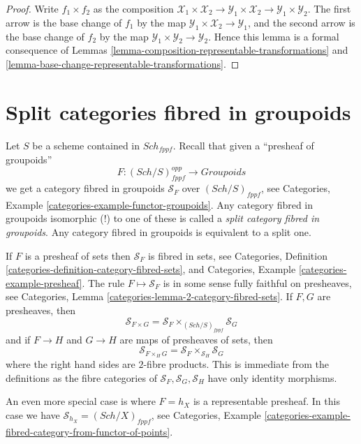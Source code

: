 \documentclass{stacks-project}
\theoremstyle{plain}
\theoremstyle{definition}
\theoremstyle{remark}
\numberwithin{equation}{subsection}
\def\Sch{\mathit{Sch}}
\begin{document}
\begin{proof}
Write $f_1 \times f_2$ as the composition
$\mathcal{X}_1 \times \mathcal{X}_2 \to
\mathcal{Y}_1 \times \mathcal{X}_2 \to
\mathcal{Y}_1 \times \mathcal{Y}_2$.
The first arrow is the base change of $f_1$ by the map
$\mathcal{Y}_1 \times \mathcal{X}_2 \to \mathcal{Y}_1$, and the second arrow
is the base change of $f_2$ by the map
$\mathcal{Y}_1 \times \mathcal{Y}_2 \to \mathcal{Y}_2$.
Hence this lemma is a formal
consequence of Lemmas \ref{lemma-composition-representable-transformations}
and \ref{lemma-base-change-representable-transformations}.
\end{proof}



\section{Split categories fibred in groupoids}
\label{section-split}

\noindent
Let $S$ be a scheme contained in $\Sch_{fppf}$.
Recall that given a ``presheaf of groupoids''
$$
F : (\Sch/S)_{fppf}^{opp} \longrightarrow \textit{Groupoids}
$$
we get a category fibred in groupoids $\mathcal{S}_F$ over
$(\Sch/S)_{fppf}$, see
Categories, Example \ref{categories-example-functor-groupoids}.
Any category fibred in groupoids isomorphic (!) to one of these
is called a {\it split category fibred in groupoids}.
Any category fibred in groupoids is equivalent to a split one.

\medskip\noindent
If $F$ is a presheaf of sets then $\mathcal{S}_F$ is
fibred in sets, see
Categories,
Definition \ref{categories-definition-category-fibred-sets},
and
Categories, Example \ref{categories-example-presheaf}.
The rule $F \mapsto \mathcal{S}_F$ is in some sense fully faithful
on presheaves, see
Categories, Lemma \ref{categories-lemma-2-category-fibred-sets}.
If $F, G$ are presheaves, then
$$
\mathcal{S}_{F \times G}
=
\mathcal{S}_F \times_{(\Sch/S)_{fppf}} \mathcal{S}_G
$$
and if $F \to H$ and $G \to H$ are maps of presheaves of sets, then
$$
\mathcal{S}_{F \times_H G} =
\mathcal{S}_F \times_{\mathcal{S}_H} \mathcal{S}_G
$$
where the right hand sides are $2$-fibre products. This is immediate
from the definitions as the fibre categories of
$\mathcal{S}_F, \mathcal{S}_G, \mathcal{S}_H$ have only identity morphisms.

\medskip\noindent
An even more special case is where $F = h_X$ is a representable
presheaf. In this case we have
$\mathcal{S}_{h_X} = (\Sch/X)_{fppf}$, see
Categories,
Example \ref{categories-example-fibred-category-from-functor-of-points}.
\end{document}
